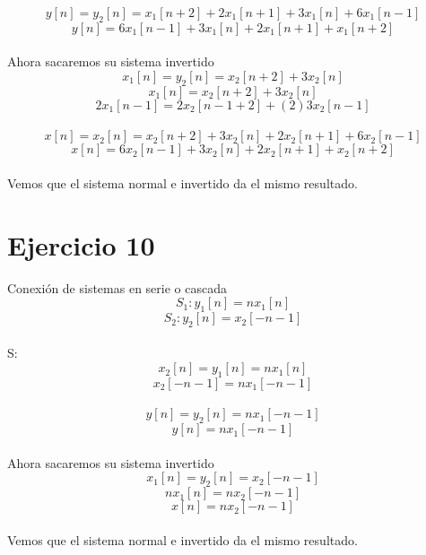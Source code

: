 \documentclass[10pt,a4paper]{report}
\begin{document}
\[
y\left [ n \right ]=y_{2}\left [ n \right ]=x_{1}\left [ n+2 \right ]+2x_{1}\left [ n+1 \right ]+3x_{1}\left [ n \right ]+6x_{1}\left [ n-1 \right ]
\]
\[
y\left [ n \right ]=6x_{1}\left [ n-1 \right ]+3x_{1}\left [ n \right ]+2x_{1}\left [ n+1 \right ]+x_{1}\left [ n+2 \right ]
\]\\

Ahora sacaremos su sistema invertido\\
\[
x_{1}\left [ n \right ]=y_{2}\left [ n \right ]=x_{2}\left [ n+2 \right ]+3x_{2}\left [ n \right ]
\]
\[
x_{1}\left [ n \right ]=x_{2}\left [ n+2 \right ]+3x_{2}\left [ n \right ]
\]
\[
2x_{1}\left [ n-1 \right ]=2x_{2}\left [ n-1+2 \right ]+(2)3x_{2}\left [ n-1 \right ]
\]\\

\[
x\left [ n \right ]=x_{2}\left [ n \right ]=x_{2}\left [ n+2 \right ]+3x_{2}\left [ n \right ]+2x_{2}\left [ n+1 \right ]+6x_{2}\left [ n-1 \right ]
\]
\[
x\left [ n \right ]=6x_{2}\left [ n-1 \right ]+3x_{2}\left [ n \right ]+2x_{2}\left [ n+1 \right ]+x_{2}\left [ n+2 \right ]
\]\\

Vemos que el sistema normal e invertido da el mismo resultado.

\section{Ejercicio 10}

Conexión de sistemas en serie o cascada\\

\[
S_{1}: y_{1}\left [ n \right ]=nx_{1}\left [ n \right ]
\]
\[
S_{2}: y_{2}\left [ n \right ]=x_{2}\left [ -n-1 \right ]
\]\\

S:\\

\[
x_{2}\left [ n \right ]=y_{1}\left [ n \right ]=nx_{1}\left [ n \right ]
\]
\[
x_{2}\left [ -n-1 \right ]=nx_{1}\left [ -n-1 \right ]
\]\\

\[
y\left [ n \right ]=y_{2}\left [ n \right ]=nx_{1}\left [ -n-1 \right ]
\]
\[
y\left [ n \right ]=nx_{1}\left [ -n-1 \right ]
\]\\

Ahora sacaremos su sistema invertido\\
\[
x_{1}\left [ n \right ]=y_{2}\left [ n \right ]=x_{2}\left [ -n-1 \right ]
\]
\[
nx_{1}\left [ n \right ]=nx_{2}\left [ -n-1 \right ]
\]
\[
x\left [ n \right ]=nx_{2}\left [ -n-1 \right ]
\]\\

Vemos que el sistema normal e invertido da el mismo resultado.
\end{document}
